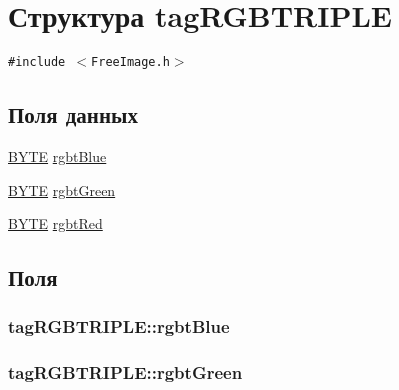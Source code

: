 \hypertarget{structtag_r_g_b_t_r_i_p_l_e}{
\section{Структура tagRGBTRIPLE}
\label{structtag_r_g_b_t_r_i_p_l_e}
}
{\tt \#include $<$FreeImage.h$>$}

\subsection*{Поля данных}
\begin{CompactItemize}
\item 
\hyperlink{filtration__run_2free_image_2_free_image_8h_ae9749d96e15ccb4f482dd5f55d98f9b}{BYTE} \hyperlink{structtag_r_g_b_t_r_i_p_l_e_dbebf9e7802cdfffbdae31c08a71dab7}{rgbtBlue}
\item 
\hyperlink{filtration__run_2free_image_2_free_image_8h_ae9749d96e15ccb4f482dd5f55d98f9b}{BYTE} \hyperlink{structtag_r_g_b_t_r_i_p_l_e_2e3e106422819352693de65189cc341f}{rgbtGreen}
\item 
\hyperlink{filtration__run_2free_image_2_free_image_8h_ae9749d96e15ccb4f482dd5f55d98f9b}{BYTE} \hyperlink{structtag_r_g_b_t_r_i_p_l_e_e61b0771fd3e1e267a3495dcfba5e21c}{rgbtRed}
\end{CompactItemize}


\subsection{Поля}
\hypertarget{structtag_r_g_b_t_r_i_p_l_e_dbebf9e7802cdfffbdae31c08a71dab7}{
\subsubsection[{rgbtBlue}]{ {\bf tagRGBTRIPLE::rgbtBlue}}}
\label{structtag_r_g_b_t_r_i_p_l_e_dbebf9e7802cdfffbdae31c08a71dab7}


\hypertarget{structtag_r_g_b_t_r_i_p_l_e_2e3e106422819352693de65189cc341f}{
\subsubsection[{rgbtGreen}]{ {\bf tagRGBTRIPLE::rgbtGreen}}}
\label{structtag_r_g_b_t_r_i_p_l_e_2e3e106422819352693de65189cc341f}


